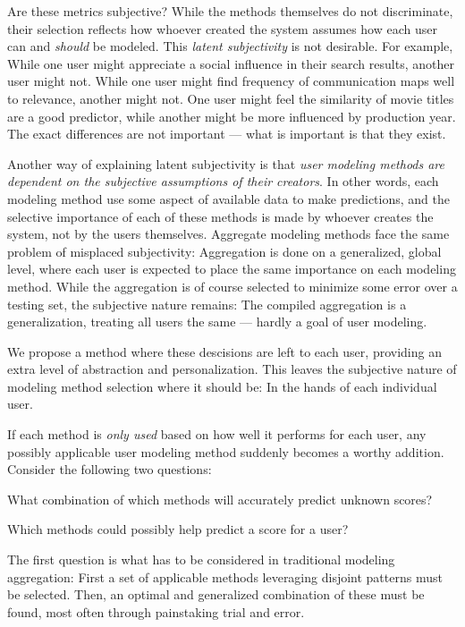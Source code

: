 Are these metrics subjective? 
While the methods themselves do not discriminate, their selection
reflects how whoever created the system assumes how each user
can and \emph{should} be modeled. This \emph{latent subjectivity} is not desirable.
For example, While one user might appreciate a social
influence in their search results, another user might not.
While one user might find frequency of communication maps well to relevance,
another might not. 
One user might feel the similarity of movie titles are a good predictor,
while another might be more influenced by production year.
The exact differences are not important --- what is important is that they exist.

Another way of explaining latent subjectivity is that 
\emph{user modeling methods are dependent on the subjective assumptions of their creators}.
In other words, each modeling method use some aspect of available data to make predictions,
and the selective importance of each of these methods is made by whoever creates the system,
not by the users themselves.
Aggregate modeling methods face the same problem of misplaced subjectivity: 
Aggregation is done on a generalized, global level,
where each user is expected to place the same importance on each modeling method.
While the aggregation is of course selected to minimize some error over a testing set,
the subjective nature remains: The compiled aggregation is a generalization,
treating all users the same --- hardly a goal of user modeling.

We propose a method where these descisions are left to each user,
providing an extra level of abstraction and personalization.
This leaves the subjective nature of modeling method selection where it should be:
In the hands of each individual user.

If each method is \emph{only used} based on how well it performs for each user,
any possibly applicable user modeling method suddenly becomes a worthy addition.
Consider the following two questions:

\begin{enumerate*}
  \item What combination of which methods will accurately predict unknown scores?
  \item Which methods could possibly help predict a score for a user?
\end{enumerate*}

The first question is what has to be considered in traditional modeling aggregation:
First a set of applicable methods leveraging disjoint patterns must be selected. 
Then, an optimal and generalized combination of these must be found,
most often through painstaking trial and error.

